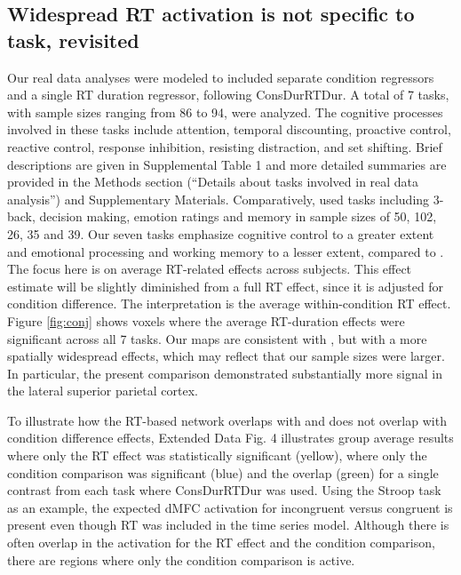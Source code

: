 \documentclass[sn-mathphys,Numbered, super, referee, lineno]{sn-jnl}
\begin{document}
\subsection*{Widespread RT activation is not specific to task, revisited}

Our real data analyses were modeled to included separate condition regressors and a single RT duration regressor, following ConsDurRTDur.  A total of 7 tasks, with sample sizes ranging from 86 to 94, were analyzed. The cognitive processes involved in these tasks include attention, temporal discounting, proactive control, reactive control, response inhibition, resisting distraction, and set shifting.  Brief descriptions are given in Supplemental Table 1 and more detailed summaries are provided in the Methods section (``Details about tasks involved in real data analysis'') and Supplementary Materials.  Comparatively, \citet{yarkoni_bold_2009} used tasks including  3-back, decision making, emotion ratings and memory in sample sizes of 50, 102, 26, 35 and 39. Our seven tasks emphasize cognitive control to a greater extent and emotional processing and working memory to a lesser extent, compared to \citet{yarkoni_bold_2009}.   The focus here is on average RT-related effects across subjects.  This effect estimate will be slightly diminished from a full RT effect, since it is adjusted for condition difference. The interpretation is the average within-condition RT effect.  Figure \ref{fig:conj} shows voxels where the average RT-duration effects were significant across all 7 tasks.  Our maps are consistent with \citet{yarkoni_bold_2009}, but with a more spatially widespread effects, which may reflect that our sample sizes were larger. In particular, the present comparison demonstrated substantially more signal in the lateral superior parietal cortex.

To illustrate how the RT-based network overlaps with and does not overlap with condition difference effects, Extended Data Fig. 4 illustrates group average results where only the RT effect was statistically significant (yellow), where only the condition comparison was significant (blue) and the overlap (green) for a single contrast from each task where ConsDurRTDur was used. Using the Stroop task as an example, the expected dMFC activation for incongruent versus congruent is present even though RT was included in the time series model.  Although there is often overlap in the activation for the RT effect and the condition comparison, there are regions where only the condition comparison is active.
\end{document}
